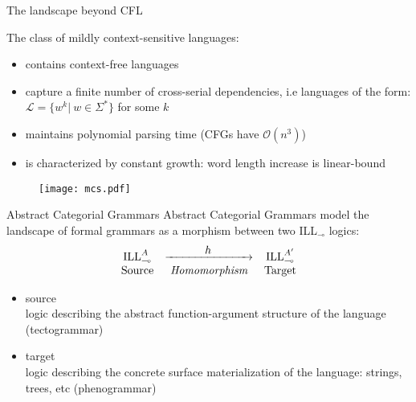 \documentclass{beamer}
\begin{document}
\begin{frame}{The landscape beyond CFL}
	\small 

	\begin{minipage}{0.65\textwidth}
	The class of \alert{mildly context-sensitive languages}:
	\begin{itemize}
		\item contains context-free languages
		\item capture a finite number of cross-serial dependencies, i.e languages of the form: $\mathcal{L} = \{w^k | \ w \in \Sigma^*\}$ for some $k$
		\item maintains polynomial parsing time (CFGs have $\mathcal{O}(n^3)$)
		\item is characterized by constant growth: word length increase is linear-bound
	\end{itemize}	
	\end{minipage}%
	\begin{minipage}{0.35\textwidth}
	\begin{figure}
	\texttt{[image: mcs.pdf]}	
	\end{figure}
	\end{minipage}
	\vfill
	
\end{frame}

\begin{frame}{Abstract Categorial Grammars}
	\small
	\alert{Abstract Categorial Grammars} model the landscape of formal grammars as a morphism between two ILL${}_\multimap$ logics:
	\[
		\begin{array}{@{}c@{\quad}c@{\quad}c@{}}
			\text{ILL}_\multimap^A & \xrightarrow{\makebox[1in]{$h$}} & \text{ILL}_\multimap^{A^\prime}\\
			\text{Source} & \textit{Homomorphism} & \text{Target}
		\end{array}
	\]
	\begin{itemize}
		\item source\\
		logic describing the abstract function-argument structure of the language (tectogrammar)
		\item target\\
		logic describing the concrete surface materialization of the language: strings, trees, etc (phenogrammar)
	\end{itemize}
\end{frame}
\end{document}
